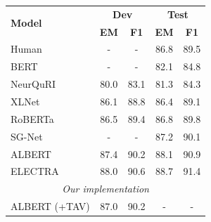 \documentclass[letterpaper]{article} %
\begin{document}
\begin{table}
	\centering
	\setlength{\tabcolsep}{5pt}
	{
		\begin{tabular}{l c c c c }
			\toprule
			\multirow{2}{*}{\textbf{Model} }& \multicolumn{2}{c}{\textbf{Dev}} & \multicolumn{2}{c}{\textbf{Test}}\\
			& \textbf{EM} & \textbf{F1}&   \textbf{EM} & \textbf{F1}\\
			\midrule
			Human& -  & - & 86.8&    89.5 \\
			\midrule
			BERT \cite{devlin2018bert} & -  & - &  82.1 &  84.8 \\
			NeurQuRI \cite{back2020neurquri} & 80.0  & 83.1 & 81.3  & 84.3 \\
			XLNet \cite{yang2019xlnet}& 86.1  & 88.8  & 86.4 &    89.1   \\
			RoBERTa \cite{liu2019roberta} & 86.5  & 89.4 &  86.8 &  89.8 \\
			SG-Net \cite{zhang2019sg} & -  & - & 87.2 &    90.1 \\
			ALBERT \cite{Lan2020ALBERT}& 87.4  & 90.2 & 88.1 &    90.9 \\
			ELECTRA \cite{clark2019electra} & 88.0 & 90.6 & 88.7 & 91.4 \\
			\midrule
			\multicolumn{5}{c}{\emph{Our implementation}} \\
			ALBERT (+TAV) & 87.0 & 90.2 & - & -\\

\end{tabular}}
\end{table}
\end{document}

